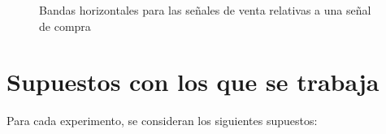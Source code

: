 \documentclass[12pt]{report}
\theoremstyle{break}
\theoremstyle{break}
\begin{document}
\begin{figure}[htbp]
\centering
{}
\caption{\label{imagen:bandas horizontales}Bandas horizontales para las señales de venta relativas a una señal de compra}
\end{figure}

\section{Supuestos con los que se trabaja}
\label{sec:supuestos del mercado}
Para cada experimento, se consideran los siguientes supuestos:
\end{document}
